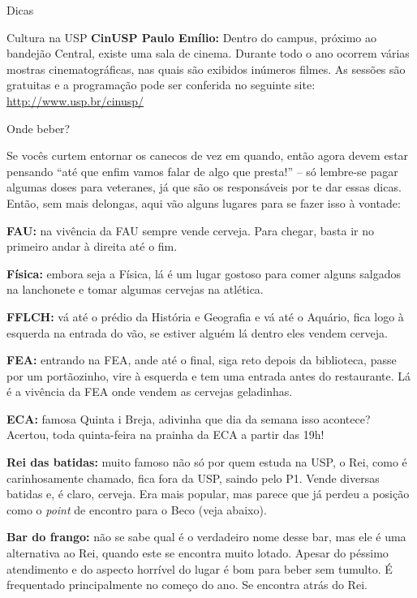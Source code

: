\begin{secao}{Dicas}
\begin{subsecao}{Cultura na USP}
{\bf CinUSP Paulo Emílio:} Dentro do campus, próximo ao bandejão Central,
existe uma sala de cinema. Durante todo o ano ocorrem várias mostras
cinematográficas, nas quais são exibidos inúmeros filmes. As sessões são gratuitas
e a programação pode ser conferida no seguinte site: \url{http://www.usp.br/cinusp/}

\end{subsecao}

\begin{subsecao}{Onde beber?}
	
Se vocês curtem entornar os canecos de vez em quando, então
agora devem estar pensando ``até que enfim vamos falar de algo que presta!'' --
só lembre-se pagar algumas doses para veteranes, já que são os responsáveis
por te dar essas dicas. Então, sem mais delongas, aqui vão
alguns lugares para se fazer isso à vontade:

{\bf FAU:} na vivência da FAU sempre vende cerveja. Para chegar, basta ir no 
primeiro andar à direita até o fim.

{\bf Física:} embora seja a Física, lá é um lugar gostoso para comer alguns
salgados na lanchonete e tomar algumas cervejas na atlética.

{\bf FFLCH:} vá até o prédio da História e Geografia e vá até o Aquário, fica 
logo à esquerda na entrada do vão, se estiver alguém lá dentro eles vendem cerveja.

{\bf FEA:} entrando na FEA, ande até o final, siga reto depois da biblioteca,
passe por um portãozinho, vire à esquerda e tem uma entrada antes do restaurante.
Lá é a vivência da FEA onde vendem as cervejas geladinhas.

{\bf ECA:} famosa Quinta i Breja, adivinha que dia da semana isso acontece?
Acertou, toda quinta-feira na prainha da ECA a partir das 19h!

{\bf Rei das batidas:} muito famoso não só por quem estuda na USP, o Rei,
como é carinhosamente chamado, fica fora da USP, saindo pelo P1. Vende
diversas batidas e, é claro, cerveja. Era mais popular, mas parece que já
perdeu a posição como o \textit{point} de encontro para o Beco (veja abaixo).

{\bf Bar do frango:} não se sabe qual é o verdadeiro nome desse bar, mas ele é
uma alternativa ao Rei, quando este se encontra muito lotado. Apesar do péssimo
atendimento e do aspecto horrível do lugar é bom para beber sem tumulto.
É frequentado principalmente no começo do ano. Se encontra atrás do Rei.


\end{subsecao}
\end{secao}
